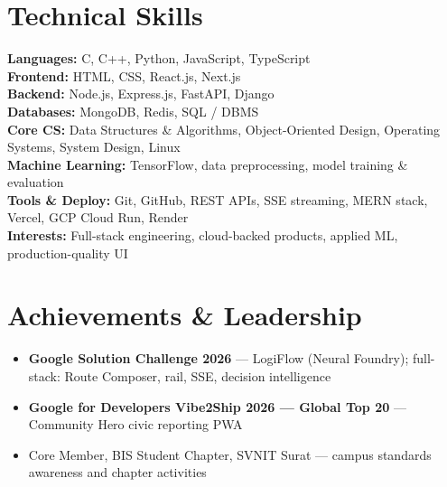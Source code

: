 \documentclass[a4paper,10pt]{article}
\begin{document}
\section{Technical Skills}
\noindent\small
\textbf{Languages:} C, C++, Python, JavaScript, TypeScript \\[0.55mm]
\textbf{Frontend:} HTML, CSS, React.js, Next.js \\[0.55mm]
\textbf{Backend:} Node.js, Express.js, FastAPI, Django \\[0.55mm]
\textbf{Databases:} MongoDB, Redis, SQL / DBMS \\[0.55mm]
\textbf{Core CS:} Data Structures \& Algorithms, Object-Oriented Design, Operating Systems, System Design, Linux \\[0.55mm]
\textbf{Machine Learning:} TensorFlow, data preprocessing, model training \& evaluation \\[0.55mm]
\textbf{Tools \& Deploy:} Git, GitHub, REST APIs, SSE streaming, MERN stack, Vercel, GCP Cloud Run, Render \\[0.55mm]
\textbf{Interests:} Full-stack engineering, cloud-backed products, applied ML, production-quality UI

\section{Achievements \& Leadership}
\begin{itemize}
  \item \textbf{Google Solution Challenge 2026} --- LogiFlow (Neural Foundry); full-stack: Route Composer, rail, SSE, decision intelligence
  \item \textbf{Google for Developers Vibe2Ship 2026 --- Global Top 20} --- Community Hero civic reporting PWA
  \item Core Member, BIS Student Chapter, SVNIT Surat --- campus standards awareness and chapter activities
\end{itemize}
\end{document}
